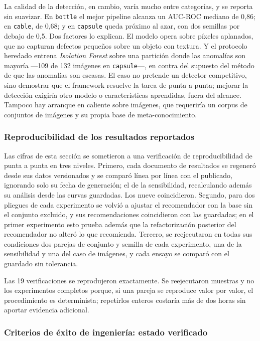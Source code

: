 \documentclass[12pt,letterpaper,oneside]{article}
\begin{document}
La calidad de la detección, en cambio, varía mucho entre categorías, y se reporta sin
suavizar. En \texttt{bottle} el mejor pipeline alcanza un AUC-ROC mediano de 0,86; en
\texttt{cable}, de 0,68; y en \texttt{capsule} queda próximo al azar, con dos semillas por
debajo de 0,5. Dos factores lo explican. El modelo opera sobre píxeles aplanados, que no
capturan defectos pequeños sobre un objeto con textura. Y el protocolo heredado entrena
\textit{Isolation Forest} sobre una partición donde las anomalías son mayoría ---109 de 132
imágenes en \texttt{capsule}---, en contra del supuesto del método de que las anomalías son
escasas. El caso no pretende un detector competitivo, sino demostrar que el framework resuelve
la tarea de punta a punta; mejorar la detección exigiría otro modelo o características
aprendidas, fuera del alcance. Tampoco hay arranque en caliente sobre imágenes, que requeriría
un corpus de conjuntos de imágenes y su propia base de meta-conocimiento.

\subsubsection{Reproducibilidad de los resultados reportados}
\label{sec:resultados-reproducibilidad}

Las cifras de esta sección se sometieron a una verificación de reproducibilidad de punta a
punta en tres niveles. Primero, cada documento de resultados se regeneró desde sus datos
versionados y se comparó línea por línea con el publicado, ignorando solo su fecha de
generación; el de la sensibilidad, recalculando además su análisis desde las curvas guardadas.
Los nueve coincidieron. Segundo, para dos pliegues de cada experimento se volvió a
ajustar el recomendador con la base sin el conjunto excluido, y sus recomendaciones
coincidieron con las guardadas; en el primer experimento esto prueba además que la
refactorización posterior del recomendador no alteró lo que recomienda. Tercero, se
reejecutaron en todas sus condiciones dos parejas de conjunto y semilla de cada experimento,
una de la sensibilidad y una del caso de imágenes, y cada ensayo se comparó con el guardado
sin tolerancia.

Las 19 verificaciones se reprodujeron exactamente. Se reejecutaron muestras y no los
experimentos completos porque, si una pareja se reproduce valor por valor, el procedimiento es
determinista; repetirlos enteros costaría más de dos horas sin aportar evidencia adicional.

\subsubsection{Criterios de éxito de ingeniería: estado verificado}
\end{document}
